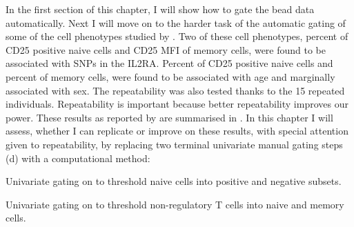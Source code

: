 In the first section of this chapter, I will show how to gate the bead data automatically.
Next I will move on to the harder task of the automatic gating of some of the cell phenotypes studied by \citet{Dendrou:2009dv}.
Two of these cell phenotypes, percent of CD25 positive naive cells and CD25 MFI of memory cells, were found to be associated with SNPs in the IL2RA.
Percent of CD25 positive naive cells and percent of memory cells, were found to be associated with age and marginally associated with sex.
The repeatability was also tested thanks to the 15 repeated individuals.
Repeatability is important because better repeatability improves our power.
These results as reported by \citet{Dendrou:2009dv} are summarised in .  
In this chapter I will assess, whether I can replicate or improve on these results, with special attention given to repeatability,
by replacing two terminal univariate manual gating steps (d)
with a computational method:
\begin{itemise}
\item Univariate gating on  to threshold naive cells into positive and negative subsets.
\item Univariate gating on  to threshold non-regulatory T cells into naive and memory cells.
\end{itemise}

